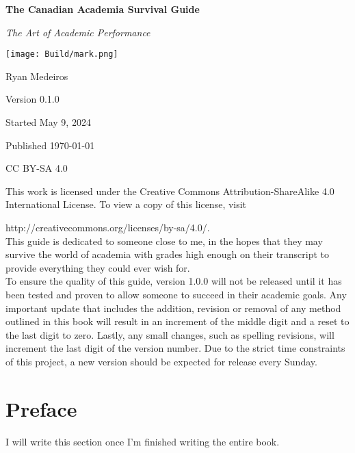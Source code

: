 \documentclass{book}
\begin{document}
\frontmatter
	\newcommand*{\titles}[7]
	{
	\begin{titlepage}
	\centering
	\bfseries \Huge  #1	\par
	\vspace{1.0cm}
	\itshape  \Large #2	\par

	\vspace{1.0cm}

	\texttt{[image: Build/mark.png]}

	\vfill\raggedleft\normalsize 

	#3	\par
	#4	\par
	#5	\par
	#6	\par
	#7	\par
	\end{titlepage}
	}
	\titles{The Canadian Academia Survival Guide}{The Art of Academic Performance}{Ryan Medeiros}{Version 0.1.0}{Started May 9, 2024}{Published \today}{CC BY-SA 4.0}

This work is licensed under the Creative Commons Attribution-ShareAlike 4.0 International License. To view a copy of this license, visit

\noindent http://creativecommons.org/licenses/by-sa/4.0/. \\

This guide is dedicated to someone close to me, in the hopes that they may survive the world of academia with grades high enough on their transcript to provide everything they could ever wish for. \\

To ensure the quality of this guide, version 1.0.0 will not be released until it has been tested and proven to allow someone to succeed in their academic goals. Any important update that includes the addition, revision or removal of any method outlined in this book will result in an increment of the middle digit and a reset to the last digit to zero. Lastly, any small changes, such as spelling revisions, will increment the last digit of the version number. Due to the strict time constraints of this project, a new version should be expected for release every Sunday.  

\hfill\vfill

\chapter{Preface}

I will write this section once I'm finished writing the entire book. 

\tableofcontents
\mainmatter
\setlength{\parskip}{0.5 cm}








\end{document}

